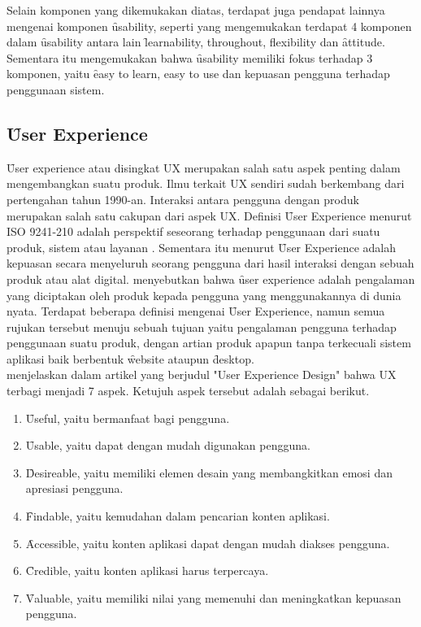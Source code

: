 Selain komponen yang dikemukakan \citeauthor{article.5ux} diatas, terdapat juga pendapat lainnya mengenai komponen \f{usability}, seperti \citet{buku.shackel} yang mengemukakan terdapat 4 komponen dalam \f{usability} antara lain \f{learnability, throughout, flexibility} dan \f{attitude}. Sementara itu \citet{paper.smith} mengemukakan bahwa \f{usability} memiliki fokus terhadap 3 komponen, yaitu \f{easy to learn, easy to use} dan kepuasan pengguna terhadap penggunaan sistem.
\subsection{\f{User Experience}}\label{subsec:userexperience}
\f{User experience} atau disingkat UX merupakan salah satu aspek penting dalam mengembangkan suatu produk. Ilmu terkait UX sendiri sudah berkembang dari pertengahan tahun 1990-an. Interaksi antara pengguna dengan produk merupakan salah satu cakupan dari aspek UX. Definisi \f{User Experience} menurut ISO 9241-210 adalah perspektif seseorang terhadap penggunaan dari suatu produk, sistem atau layanan \citep{buku.alsos}. Sementara itu menurut \citet{article.nielsen} \f{User Experience} adalah kepuasan secara menyeluruh seorang pengguna dari hasil interaksi dengan sebuah produk atau alat digital. \citet{buku.rubin} menyebutkan bahwa \f{user experience} adalah pengalaman yang diciptakan oleh produk kepada pengguna yang menggunakannya di dunia nyata.
Terdapat beberapa definisi mengenai \f{User Experience}, namun semua rujukan tersebut menuju sebuah tujuan yaitu pengalaman pengguna terhadap penggunaan suatu produk, dengan artian produk apapun tanpa terkecuali sistem aplikasi baik berbentuk \f{website} ataupun \f{desktop}.
\newline\\
\citet{article.peter} menjelaskan dalam artikel yang berjudul "User Experience Design" bahwa UX terbagi menjadi 7 aspek. Ketujuh aspek tersebut adalah sebagai berikut.
\begin{enumerate}
	\item \f{Useful}, yaitu bermanfaat bagi pengguna.
	\item \f{Usable}, yaitu dapat dengan mudah digunakan pengguna.
	\item \f{Desireable}, yaitu memiliki elemen desain yang membangkitkan emosi dan apresiasi pengguna.
	\item \f{Findable}, yaitu kemudahan dalam pencarian konten aplikasi.
	\item \f{Accessible}, yaitu konten aplikasi dapat dengan mudah diakses pengguna. 
	\item \f{Credible}, yaitu konten aplikasi harus terpercaya.
	\item \f{Valuable}, yaitu memiliki nilai yang memenuhi dan meningkatkan kepuasan pengguna.
\end{enumerate}
